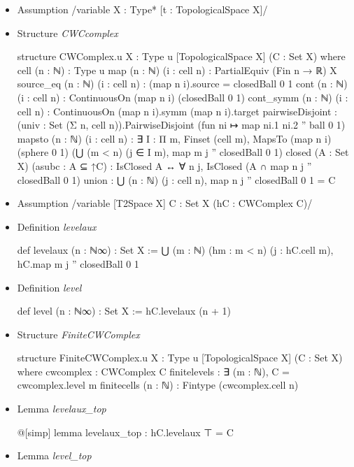 \documentclass[colorinlistoftodos]{article}
\newcommand{\question}[1]{\todo[color=green!40]{#1}}
\begin{document}
\begin{itemize}
  \item Assumption \lean /variable {X : Type*} [t : TopologicalSpace X]/
  \item Structure \emph{CWCcomplex}
\begin{leancode}
structure CWComplex.{u} {X : Type u} [TopologicalSpace X] (C : Set X) where
  cell (n : ℕ) : Type u
  map (n : ℕ) (i : cell n) : PartialEquiv (Fin n → ℝ) X
  source_eq (n : ℕ) (i : cell n) : (map n i).source = closedBall 0 1
  cont (n : ℕ) (i : cell n) : ContinuousOn (map n i) (closedBall 0 1)
  cont_symm (n : ℕ) (i : cell n) : ContinuousOn (map n i).symm (map n i).target
  pairwiseDisjoint :
    (univ : Set (Σ n, cell n)).PairwiseDisjoint (fun ni ↦ map ni.1 ni.2 '' ball 0 1)
  mapsto (n : ℕ) (i : cell n) : ∃ I : Π m, Finset (cell m),
    MapsTo (map n i) (sphere 0 1) (⋃ (m < n) (j ∈ I m), map m j '' closedBall 0 1)
  closed (A : Set X) (asubc : A ⊆ ↑C) : 
    IsClosed A ↔ ∀ n j, IsClosed (A ∩ map n j '' closedBall 0 1)
  union : ⋃ (n : ℕ) (j : cell n), map n j '' closedBall 0 1 = C
\end{leancode}
  \item Assumption \lean /variable [T2Space X] {C : Set X} (hC : CWComplex C)/
  \item Definition \emph{levelaux}
\begin{leancode}
def levelaux (n : ℕ∞) : Set X :=
  ⋃ (m : ℕ) (hm : m < n) (j : hC.cell m), hC.map m j '' closedBall 0 1
\end{leancode}
  \item Definition \emph{level}
\begin{leancode}
def level (n : ℕ∞) : Set X :=
  hC.levelaux (n + 1)
\end{leancode}
  \item Structure \emph{FiniteCWComplex} \question{Is this a good way to define this?}
\begin{leancode}
structure FiniteCWComplex.{u} {X : Type u} [TopologicalSpace X] (C : Set X) where
  cwcomplex : CWComplex C
  finitelevels : ∃ (m : ℕ), C = cwcomplex.level m 
  finitecells (n : ℕ) : Fintype (cwcomplex.cell n)
\end{leancode}
  \item Lemma \emph{levelaux\_top}
\begin{leancode}
@[simp] lemma levelaux_top : hC.levelaux ⊤ = C
\end{leancode}
  \item Lemma \emph{level\_top}
\begin{leancode}

\end{leancode}
\end{itemize}
\end{document}
